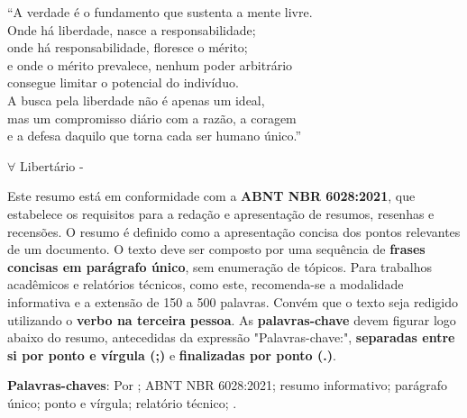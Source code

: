 \documentclass{Arquivos/TrabalhoAcademico}
\begin{document}
\begin{epigrafe}
    ``A verdade é o fundamento que sustenta a mente livre.\\
    Onde há liberdade, nasce a responsabilidade;\\
    onde há responsabilidade, floresce o mérito;\\
    e onde o mérito prevalece, nenhum poder arbitrário\\
    consegue limitar o potencial do indivíduo.\\
    A busca pela liberdade não é apenas um ideal,\\
    mas um compromisso diário com a razão, a coragem\\
    e a defesa daquilo que torna cada ser humano único.''
    
    $\forall$ Libertário - \WenesTex
\end{epigrafe}




\begin{resumo}
Este resumo está em conformidade com a \textbf{ABNT NBR 6028:2021}, que estabelece os requisitos para a redação e apresentação de resumos, resenhas e recensões. O resumo é definido como a apresentação concisa dos pontos relevantes de um documento. O texto deve ser composto por uma sequência de \textbf{frases concisas em parágrafo único}, sem enumeração de tópicos. Para trabalhos acadêmicos e relatórios técnicos, como este, recomenda-se a modalidade informativa e a extensão de 150 a 500 palavras. Convém que o texto seja redigido utilizando o \textbf{verbo na terceira pessoa}. As \textbf{palavras-chave} devem figurar logo abaixo do resumo, antecedidas da expressão "Palavras-chave:", \textbf{separadas entre si por ponto e vírgula (;)} e \textbf{finalizadas por ponto (.)}.

\textbf{Palavras-chaves}: Por \WenesTex; ABNT NBR 6028:2021; resumo informativo; parágrafo único; ponto e vírgula; relatório técnico; \abnTexUFT.
\end{resumo}


\begin{resumoEN}

\end{resumoEN}


\listaDeFiguras
\listaDeTabelas
\end{document}
